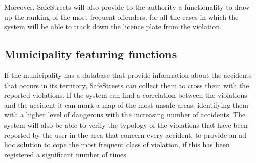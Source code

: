 \documentclass[../RASD.tex]{subfiles}
\begin{document}
    Moreover, SafeStreets will also provide to the authority a functionality to draw up the ranking of the most frequent offenders, for all the cases in which the system will be able to track down the licence plate from the violation.
    \subsection{Municipality featuring functions}\label{subsec:municipality-featuring-functions}
    If the municipality has a database that provide information about the accidents that occurs in its territory, SafeStreets can collect them to cross them with the reported violations. If the system can find a correlation between the violations and the accident it can mark a map of the most unsafe areas, identifying them with a higher level of dangerous with the increasing number of accidents. The system will also be able to verify the typology of the violations that have been reported by the user in the area that concern every accident, to provide an ad hoc solution to cope the most frequent class of violation, if this has been registered a significant number of times.
\end{document}
